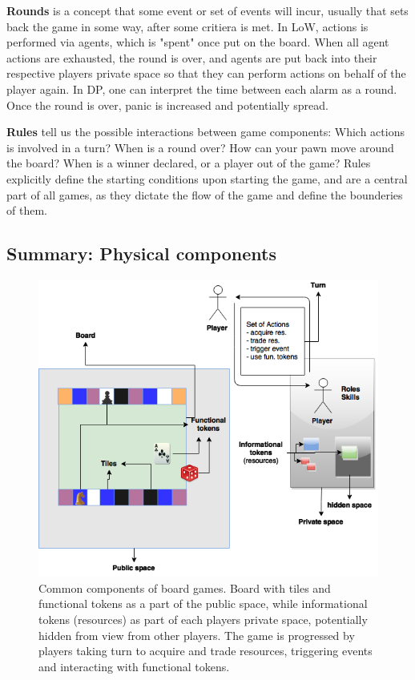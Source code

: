 \textbf{Rounds} is a concept that some event or set of events will incur, usually that sets back the game in some way, after some critiera is met. In LoW, actions is performed via agents, which is "spent" once put on the board. When all agent actions are exhausted, the round is over, and agents are put back into their respective players private space so that they can perform actions on behalf of the player again. In DP, one can interpret the time between each alarm as a round. Once the round is over, panic is increased and potentially spread.

\textbf{Rules} tell us the possible interactions between game components: Which actions is involved in a turn? When is a round over? How can your pawn move around the board? When is a winner declared, or a player out of the game? Rules explicitly define the starting conditions upon starting the game, and are a central part of all games, as they dictate the flow of the game and define the bounderies of them.

\subsection{Summary: Physical components} \label{subsubsec:boardgame_components}

\begin{figure}[ht]
\includegraphics[width=12cm]{img/board_games_components}
\centering
\caption{Common components of board games. Board with tiles and functional tokens as a part of the public space, while informational tokens (resources) as part of each players private space, potentially hidden from view from other players. The game is progressed by players taking turn to acquire and trade resources, triggering events and interacting with functional tokens.}
\label{fig:board_games_components}
\end{figure}


